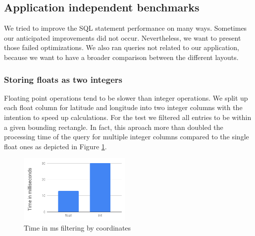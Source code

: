 \documentclass[10pt]{sig-alternate}
\begin{document}
\subsection{Application independent benchmarks}
We tried to improve the SQL statement performance on many ways. Sometimes our anticipated improvements did not occur. Nevertheless, we want to present those failed optimizations. We also ran queries not related to our application, because we want to have a broader comparison between the different layouts.

\subsubsection{Storing floats as two integers}
Floating point operations tend to be slower than integer operations. We split up each float column for latitude and longitude into two integer columns with the intention to speed up calculations. For the test we filtered all entries to be within a given bounding rectangle. In fact, this aproach more than doubled the processing time of the query for multiple integer columns compared to the single float ones as depicted in Figure \ref{fig:bench_coordinates_as_int}.
\begin{figure}[ht]
  \centering
  \includegraphics[width=0.48\textwidth]{img/bench_coordinates_as_int.png}
  \caption{Time in ms filtering by coordinates}
  \label{fig:bench_coordinates_as_int}
\end{figure}
\end{document}
